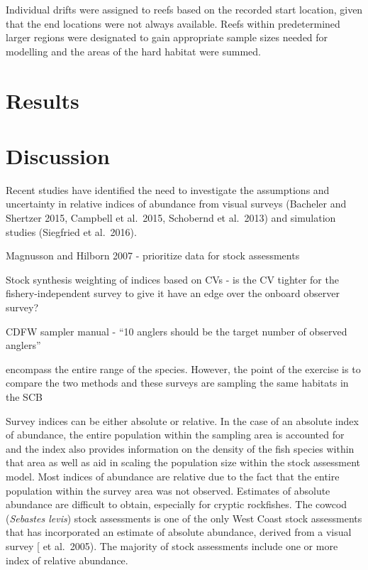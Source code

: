 \documentclass[preprint, 3p,
authoryear]{elsarticle} %
\begin{document}
Individual drifts were assigned to reefs based on the recorded start
location, given that the end locations were not always available. Reefs
within predetermined larger regions were designated to gain appropriate
sample sizes needed for modelling and the areas of the hard habitat were
summed.

\hypertarget{results}{%
\section{Results}\label{results}}

\hypertarget{discussion}{%
\section{Discussion}\label{discussion}}

Recent studies have identified the need to investigate the assumptions
and uncertainty in relative indices of abundance from visual surveys
(Bacheler and Shertzer 2015, Campbell et al.~2015, Schobernd et
al.~2013) and simulation studies (Siegfried et al.~2016).

Magnusson and Hilborn 2007 - prioritize data for stock assessments

Stock synthesis weighting of indices based on CVs - is the CV tighter
for the fishery-independent survey to give it have an edge over the
onboard observer survey?

CDFW sampler manual - ``10 anglers should be the target number of
observed anglers''

encompass the entire range of the species. However, the point of the
exercise is to compare the two methods and these surveys are sampling
the same habitats in the SCB

Survey indices can be either absolute or relative. In the case of an
absolute index of abundance, the entire population within the sampling
area is accounted for and the index also provides information on the
density of the fish species within that area as well as aid in scaling
the population size within the stock assessment model. Most indices of
abundance are relative due to the fact that the entire population within
the survey area was not observed. Estimates of absolute abundance are
difficult to obtain, especially for cryptic rockfishes. The cowcod
(\emph{Sebastes levis}) stock assessments is one of the only West Coast
stock assessments that has incorporated an estimate of absolute
abundance, derived from a visual survey {[}\citet{Piner} et al.~2005).
The majority of stock assessments include one or more index of relative
abundance.
\end{document}
